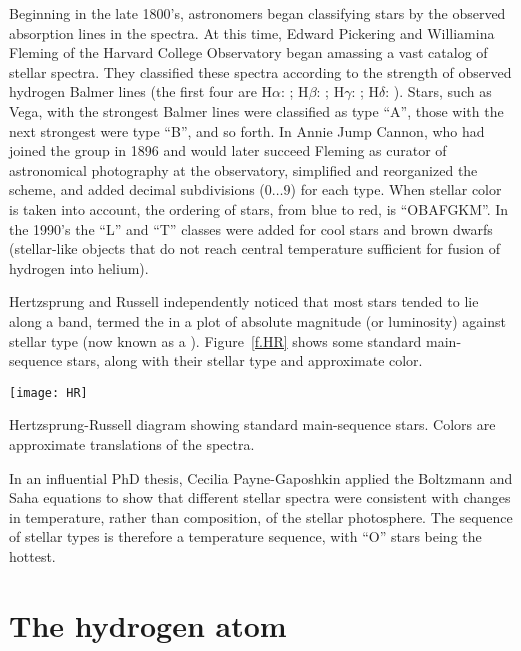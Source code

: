 Beginning in the late 1800's, astronomers began classifying stars by the observed absorption lines in the spectra. At this time, Edward Pickering and Williamina Fleming of the Harvard College Observatory began amassing a vast catalog of stellar spectra. They classified these spectra according to the strength of observed hydrogen Balmer lines (the first four are H$\alpha$: ; H$\beta$: ; H$\gamma$: ; H$\delta$: ). Stars, such as Vega, with the strongest Balmer lines were classified as type ``A'', those with the next strongest were type ``B'', and so forth. In Annie Jump Cannon, who had joined the group in 1896 and would later succeed Fleming as curator of astronomical photography at the observatory, simplified and reorganized the scheme, and added decimal subdivisions ($0\ldots9$) for each type. When stellar color is taken into account, the ordering of stars, from blue to red, is ``OBAFGKM''. In the 1990's the ``L'' and ``T'' classes were added\cite{Kirkpatrick1999Dwarfs-Cooler-t} for cool stars and brown dwarfs (stellar-like objects that do not reach central temperature sufficient for fusion of hydrogen into helium).

Hertzsprung and Russell independently noticed that most stars tended to lie along a band, termed the  in a plot of absolute magnitude (or luminosity) against stellar type (now known as a ). Figure~\ref{f.HR} shows some standard main-sequence stars, along with their stellar type and approximate color.
\begin{marginfigure}
\texttt{[image: HR]}
\caption{\label{f.HR} Hertzsprung-Russell diagram showing standard main-sequence stars. Colors are approximate translations of the spectra.}
\end{marginfigure}

In an influential PhD thesis, Cecilia Payne-Gaposhkin\cite{Payne1925Stellar-Atmosph} applied the Boltzmann and Saha equations to show that different stellar spectra were consistent with changes in temperature, rather than composition, of the stellar photosphere. The sequence of stellar types is therefore a temperature sequence, with ``O'' stars being the hottest. 

\section{The hydrogen atom}

